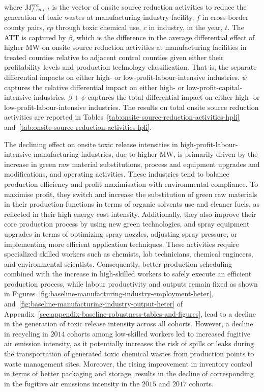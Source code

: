 \documentclass[12pt, english]{article}
\begin{document}
    where $M_{f,cp,c,t}^{sra}$ is the vector of onsite source reduction activities to reduce the generation of toxic wastes at manufacturing industry facility, $f$ in cross-border county pairs, $cp$ through toxic chemical use, $c$ in industry, in the year, $t$. The ATT is captured by $\beta$, which is the difference in the average differential effect of higher MW on onsite source reduction activities at manufacturing facilities in treated counties relative to adjacent control counties given either their profitability levels and production technology classification. That is, the separate differential impacts on either high- or low-profit-labour-intensive industries. $\psi$ captures the relative differential impact on either high- or low-profit-capital-intensive industries. $\beta + \psi$ captures the total differential impact on either high- or low-profit-labour-intensive industries. The results on total onsite source reduction activities are reported in Tables~\ref{tab:onsite-source-reduction-activities-hpli} and~\ref{tab:onsite-source-reduction-activities-lpli}.

    The declining effect on onsite toxic release intensities in high-profit-labour-intensive manufacturing industries, due to higher MW, is primarily driven by the increase in green raw material substitutions, process and equipment upgrades and modifications, and operating activities. These industries tend to balance production efficiency and profit maximisation with environmental compliance. To maximise profit, they switch and increase the substitution of green raw materials in their production functions in terms of organic solvents use and cleaner fuels, as reflected in their high energy cost intensity. Additionally, they also improve their core production process by using new green technologies, and spray equipment upgrades in terms of optimizing spray nozzles, adjusting spray pressure, or implementing more efficient application techniques. These activities require specialized skilled workers such as chemists, lab technicians, chemical engineers, and environmental scientists. Consequently, better production scheduling combined with the increase in high-skilled workers to safely execute an efficient production process, while labour productivity and outputs remain fixed as shown in Figures~\ref{fig:baseline-manufacturing-industry-employment-heter}, and~\ref{fig:baseline-manufacturing-industry-output-heter} of Appendix~\ref{sec:appendix-baseline-robustness-tables-and-figures}, lead to a decline in the generation of toxic release intensity across all cohorts. However, a decline in recycling in $2014$ cohorts among low-skilled workers led to increased fugitive air emission intensity, as it potentially increases the risk of spills or leaks during the transportation of generated toxic chemical wastes from production points to waste management sites. Moreover, the rising improvement in inventory control in terms of better packaging and storage, results in the decline of corresponding in the fugitive air emissions intensity in the $2015$ and $2017$ cohorts.
    
\end{document}
